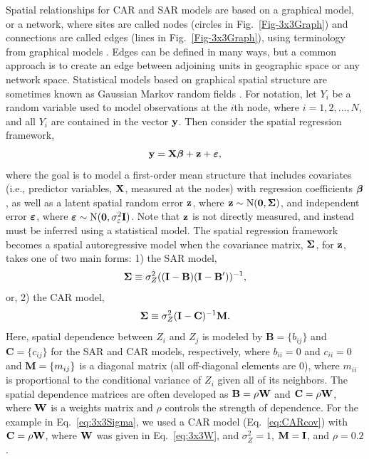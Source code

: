 \documentclass[11pt, titlepage]{article}\usepackage[]{graphicx}\usepackage[]{color}
\begin{document}
\begin{spacing}{1.9}
\begin{flushleft}
Spatial relationships for CAR and SAR models are based on a graphical model, or a network, where sites are called nodes (circles in Fig.~\ref{Fig-3x3Graph}) and connections are called edges (lines in Fig.~\ref{Fig-3x3Graph}), using terminology from graphical models \citep[e.g.,][]{Laur:grap:1996, Whit:grap:2009}. Edges can be defined in many ways, but a common approach is to create an edge between adjoining units in geographic space or any network space. Statistical models based on graphical spatial structure are sometimes known as Gaussian Markov random fields \citep[e.g.,][]{Rue:Held:Gaus:2005}.  For notation, let $Y_i$ be a random variable used to model observations at the $i$th node, where $i = 1, 2, \dots, N$, and all $Y_i$ are contained in the vector $\mathbf{y}$. Then consider the spatial regression framework, 
\begin{equation}
  \mathbf{y} = \mathbf{X}\mbox{\boldmath $\beta$} + \mathbf{z}  + \mbox{\boldmath $\varepsilon$},
  \label{eq:ArealFramework}
\end{equation}
where the goal is to model a first-order mean structure that includes covariates (i.e., predictor variables, $\mathbf{X}$, measured at the nodes) with regression coefficients $\mbox{\boldmath $\beta$}$, as well as a latent spatial random error $\mathbf{z}$, where $\mathbf{z} \sim \textrm{N}(\mathbf{0},\mbox{\boldmath $\Sigma$})$, and independent error $\mbox{\boldmath $\varepsilon$}$, where $\mbox{\boldmath $\varepsilon$} \sim \textrm{N}(\mathbf{0},\sigma^2_\varepsilon \mathbf{I})$. Note that $\mathbf{z}$ is not directly measured, and instead must be inferred using a statistical model. The spatial regression framework becomes a spatial autoregressive model when the covariance matrix, $\mbox{\boldmath $\Sigma$}$, for $\mathbf{z}$, takes one of two main forms: 1) the SAR model,
\begin{equation} \label{eq:SARcov}
  \mbox{\boldmath $\Sigma$} \equiv \sigma^2_Z ((\mathbf{I}-\mathbf{B})(\mathbf{I}-\mathbf{B}^{\prime}))^{-1},
\end{equation}
or, 2) the CAR model,
\begin{equation} \label{eq:CARcov}
  \mbox{\boldmath $\Sigma$} \equiv \sigma^2_Z (\mathbf{I}-\mathbf{C})^{-1}\mathbf{M}.
\end{equation}
Here, spatial dependence between $Z_i$ and $Z_j$ is modeled by $\mathbf{B} = \{b_{ij}\}$ and $\mathbf{C} = \{c_{ij}\}$ for the SAR and CAR models, respectively, where $b_{ii} = 0$ and $c_{ii} = 0$ and $\mathbf{M} = \{m_{ij}\}$ is a diagonal matrix (all off-diagonal elements are 0), where $m_{ii}$ is proportional to the conditional variance of $Z_i$ given all of its neighbors. The spatial dependence matrices are often developed as $\mathbf{B} = \rho\mathbf{W}$ and $\mathbf{C} = \rho\mathbf{W}$, where $\mathbf{W}$ is a weights matrix and $\rho$ controls the strength of dependence.  For the example in Eq.~\ref{eq:3x3Sigma}, we used a CAR model (Eq.~\ref{eq:CARcov}) with $\mathbf{C} = \rho\mathbf{W}$, where $\mathbf{W}$ was given in Eq.~\ref{eq:3x3W}, and $\sigma^2_Z =1$, $\mathbf{M} = \mathbf{I}$, and $\rho = 0.2$.


\end{flushleft}
\end{spacing}
\end{document}
